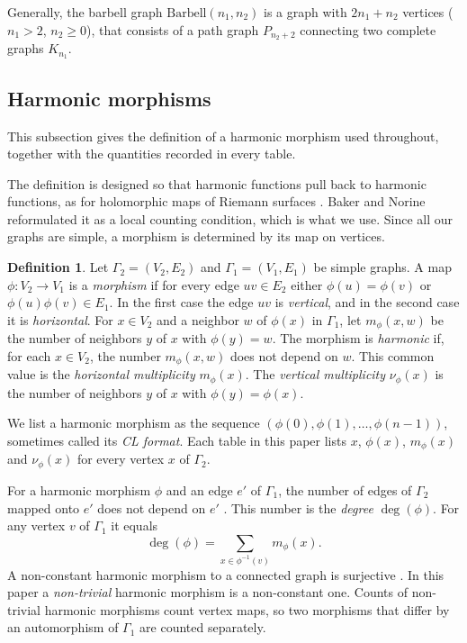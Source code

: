 \documentclass[12pt,letterpaper]{article}
\theoremstyle{definition}
\newtheorem{definition}[theorem]{Definition}
\begin{document}
Generally, the barbell graph $\mathrm{Barbell}(n_1, n_2)$
is a graph with $2n_1 + n_2$ vertices ($n_1>2$, $n_2\geq 0$),
that consists of a path graph $P_{n_2+2}$ connecting two complete graphs
$K_{n_1}$.



\subsection{Harmonic morphisms}
\label{sec:harmonic-morphisms}

This subsection gives the definition of a harmonic morphism used throughout,
together with the quantities recorded in every table.

The definition is designed so that harmonic functions pull back to harmonic
functions, as for holomorphic maps of Riemann surfaces \cite{Ur00}. Baker and
Norine \cite[\S2.1]{BN09} reformulated it as a local counting condition,
which is what we use. Since all our graphs are simple, a morphism is
determined by its map on vertices.

\begin{definition}
\label{def:harmonic}
Let $\Gamma_2=(V_2,E_2)$ and $\Gamma_1=(V_1,E_1)$ be simple graphs. A map
$\phi:V_2\to V_1$ is a {\it morphism} if for every edge $uv\in E_2$ either
$\phi(u)=\phi(v)$ or $\phi(u)\phi(v)\in E_1$. In the first case the edge $uv$
is {\it vertical}, and in the second case it is {\it horizontal}. For
$x\in V_2$ and a neighbor $w$ of $\phi(x)$ in $\Gamma_1$, let $m_\phi(x,w)$ be
the number of neighbors $y$ of $x$ with $\phi(y)=w$. The morphism is
{\it harmonic} if, for each $x\in V_2$, the number $m_\phi(x,w)$ does not
depend on $w$. This common value is the {\it horizontal multiplicity}
$m_\phi(x)$. The {\it vertical multiplicity} $\nu_\phi(x)$ is the number of
neighbors $y$ of $x$ with $\phi(y)=\phi(x)$.
\end{definition}

We list a harmonic morphism as the sequence
$(\phi(0),\phi(1),\dots,\phi(n-1))$, sometimes called its {\it CL format}.
Each table in this paper lists $x$, $\phi(x)$, $m_\phi(x)$ and $\nu_\phi(x)$
for every vertex $x$ of $\Gamma_2$.

For a harmonic morphism $\phi$ and an edge $e'$ of $\Gamma_1$, the number of
edges of $\Gamma_2$ mapped onto $e'$ does not depend on $e'$
\cite[Lemma~2.4]{BN09}. This number is the {\it degree} $\deg(\phi)$. For any
vertex $v$ of $\Gamma_1$ it equals
\[
\deg(\phi)=\sum_{x\in\phi^{-1}(v)} m_\phi(x).
\]
A non-constant harmonic morphism to a connected graph is surjective
\cite[Lemma~2.7]{BN09}. In this paper a {\it non-trivial} harmonic
morphism is a non-constant one. Counts of non-trivial harmonic morphisms
count vertex maps, so two morphisms that differ by an automorphism of
$\Gamma_1$ are counted separately.
\end{document}
